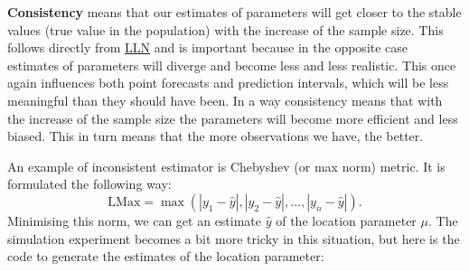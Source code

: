 \documentclass[
]{book}
\newenvironment{Shaded}{\begin{snugshade}}{\end{snugshade}}
\newcommand{\ControlFlowTok}[1]{\textcolor[rgb]{0.13,0.29,0.53}{\textbf{#1}}}
\newcommand{\DataTypeTok}[1]{\textcolor[rgb]{0.13,0.29,0.53}{#1}}
\newcommand{\DecValTok}[1]{\textcolor[rgb]{0.00,0.00,0.81}{#1}}
\newcommand{\KeywordTok}[1]{\textcolor[rgb]{0.13,0.29,0.53}{\textbf{#1}}}
\newcommand{\NormalTok}[1]{#1}
\newcommand{\OperatorTok}[1]{\textcolor[rgb]{0.81,0.36,0.00}{\textbf{#1}}}
\newcommand{\StringTok}[1]{\textcolor[rgb]{0.31,0.60,0.02}{#1}}
\theoremstyle{definition}
\theoremstyle{definition}
\theoremstyle{definition}
\theoremstyle{definition}
\theoremstyle{remark}
\begin{document}
\textbf{Consistency} means that our estimates of parameters will get closer to the stable values (true value in the population) with the increase of the sample size. This follows directly from \protect\hyperlink{LLNandCLT}{LLN} and is important because in the opposite case estimates of parameters will diverge and become less and less realistic. This once again influences both point forecasts and prediction intervals, which will be less meaningful than they should have been. In a way consistency means that with the increase of the sample size the parameters will become more efficient and less biased. This in turn means that the more observations we have, the better.

An example of inconsistent estimator is Chebyshev (or max norm) metric. It is formulated the following way:
\begin{equation}
    \mathrm{LMax} = \max \left(|y_1-\hat{y}|, |y_2-\hat{y}|, \dots, |y_n-\hat{y}| \right).
    \label{eq:chebyshevNorm}
\end{equation}
Minimising this norm, we can get an estimate \(\hat{y}\) of the location parameter \(\mu\). The simulation experiment becomes a bit more tricky in this situation, but here is the code to generate the estimates of the location parameter:

\begin{Shaded}
\end{Shaded}
\end{document}
